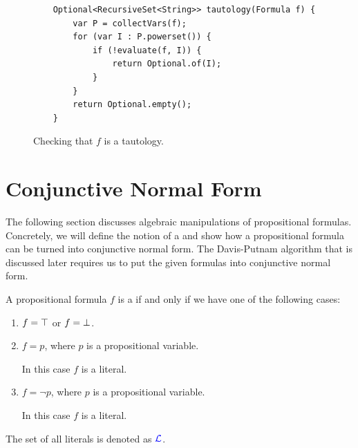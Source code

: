 \begin{figure}[!ht]
  \centering
\begin{verbatim}
    Optional<RecursiveSet<String>> tautology(Formula f) {
        var P = collectVars(f);
        for (var I : P.powerset()) {
            if (!evaluate(f, I)) {
                return Optional.of(I);
            }
        }
        return Optional.empty();
    }
\end{verbatim}
\vspace*{-0.3cm}
  \caption{Checking that $f$ is a tautology.}
  \label{fig:tautology.py}
\end{figure}


\section{Conjunctive Normal Form}
The following section discusses algebraic manipulations of propositional formulas.  Concretely, we will define
the notion of a  and show how a propositional formula can be turned into
conjunctive normal form.  The Davis-Putnam algorithm that is discussed later requires us to put the given
formulas into conjunctive normal form.

\begin{Definition}[Literal]
  A propositional formula $f$ is a  if and only if we have one of the following cases: 
  \begin{enumerate}
  \item $f = \top$ or $f = \bot$.
  \item $f = p$, where $p$ is a propositional variable.

        In this case $f$ is a  literal.
  \item $f = \neg p$, where $p$ is a propositional variable. 

        In this case $f$ is a  literal.
  \end{enumerate}
  The set of all literals is denoted as  ${\color{blue}\mathcal{L}}$.  \eox
\end{Definition}

